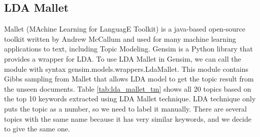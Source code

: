 \documentclass[12pt]{article}
\begin{document}
\subsection{LDA Mallet}
Mallet (MAchine Learning for LanguagE Toolkit) \cite{mallet} is a java-based open-source toolkit written by Andrew McCallum and used for many machine learning applications to text, including Topic Modeling. Gensim is a Python library that provides a wrapper for LDA. To use LDA Mallet in Gensim, we can call the module with syntax gensim.models.wrappers.LdaMallet. This module contains Gibbs sampling from Mallet that allows LDA model to get the topic result from the unseen documents. Table \ref{tab:lda_mallet_tm} shows all 20 topics based on the top 10 keywords extracted using LDA Mallet technique. LDA technique only puts the topic as a number, so we need to label it manually. There are several topics with the same name because it has very similar keywords, and we decide to give the same one.
\end{document}
